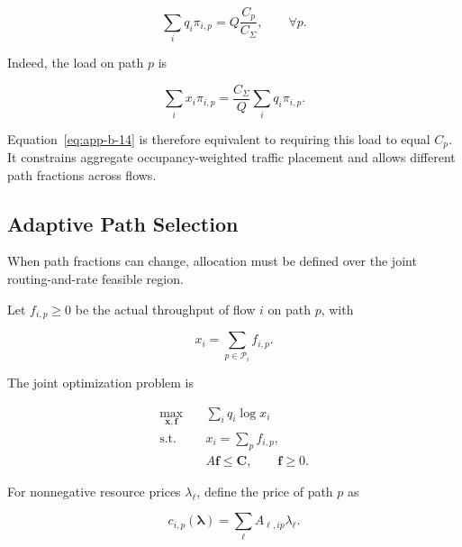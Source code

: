 \begin{equation}
\label{eq:app-b-14}
\boxed{
\sum_iq_i\pi_{i,p}
=Q\frac{C_p}{C_\Sigma},
\qquad \forall p.
}
\end{equation}

Indeed, the load on path \(p\) is

\begin{equation}
\label{eq:app-b-15}
\sum_i x_i\pi_{i,p}
=
\frac{C_\Sigma}{Q}\sum_iq_i\pi_{i,p}.
\end{equation}

Equation~\eqref{eq:app-b-14} is therefore equivalent to requiring this load to equal \(C_p\). It constrains aggregate occupancy-weighted traffic placement and allows different path fractions across flows.

\subsection{Adaptive Path Selection}
\label{app:b-3}

When path fractions can change, allocation must be defined over the joint routing-and-rate feasible region.

Let \(f_{i,p}\ge0\) be the actual throughput of flow \(i\) on path \(p\), with

\begin{equation}
\label{eq:app-b-16}
x_i=\sum_{p\in\mathcal P_i}f_{i,p}.
\end{equation}

The joint optimization problem is

\begin{equation}
\label{eq:app-b-17}
\begin{aligned}
\max_{\mathbf x,\mathbf f}\quad
&\sum_iq_i\log x_i\\
\text{s.t.}\quad
&x_i=\sum_p f_{i,p},\\
&A\mathbf f\le\mathbf C,\qquad \mathbf f\ge0.
\end{aligned}
\end{equation}

For nonnegative resource prices \(\lambda_\ell\), define the price of path \(p\) as

\begin{equation}
\label{eq:app-b-18}
c_{i,p}(\boldsymbol\lambda)
=\sum_\ell A_{\ell,ip}\lambda_\ell.
\end{equation}

